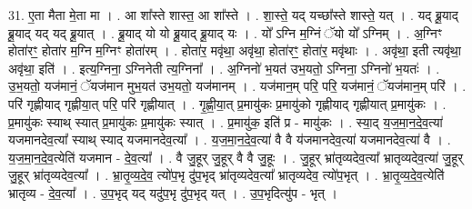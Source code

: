 \documentclass[17pt]{extarticle}
\begin{document}
31. ए॒ता मैता मे॒ता मा । . आ शा᳚स्ते शास्त॒ आ शा᳚स्ते । . शा॒स्ते॒ यद् यच्छा᳚स्ते शास्ते॒ यत् । . यद् ब्रू॒याद् ब्रू॒याद् यद् यद् ब्रू॒यात् । . ब्रू॒याद् यो यो ब्रू॒याद् ब्रू॒याद् यः । . यो᳚ ऽग्नि म॒ग्निं ॅयो यो᳚ ऽग्निम् । . अ॒ग्निꣳ होता॑रꣳ॒॒ होता॑र म॒ग्नि म॒ग्निꣳ होता॑रम् । . होता॑र॒ मवृ॑था॒ अवृ॑था॒ होता॑रꣳ॒॒ होता॑र॒ मवृ॑थाः । . अवृ॑था॒ इती त्यवृ॑था॒ अवृ॑था॒ इति॑ । . इत्य॒ग्निना॒ ऽग्निनेती त्य॒ग्निना᳚ । . अ॒ग्निनो॑ भ॒यत॑ उभ॒यतो॒ ऽग्निना॒ ऽग्निनो॑ भ॒यतः॑ । . उ॒भ॒यतो॒ यज॑मानं॒ ॅयज॑मान मुभ॒यत॑ उभ॒यतो॒ यज॑मानम् । . यज॑मान॒म् परि॒ परि॒ यज॑मानं॒ ॅयज॑मान॒म् परि॑ । . परि॑ गृह्णीयाद् गृह्णीया॒त् परि॒ परि॑ गृह्णीयात् । . गृ॒ह्णी॒या॒त् प्र॒मायु॑कः प्र॒मायु॑को गृह्णीयाद् गृह्णीयात् प्र॒मायु॑कः । . प्र॒मायु॑कः स्याथ् स्यात् प्र॒मायु॑कः प्र॒मायु॑कः स्यात् । . प्र॒मायु॑क॒ इति॑ प्र - मायु॑कः । . स्या॒द् य॒ज॒मा॒न॒दे॒व॒त्या॑ यजमानदेव॒त्या᳚ स्याथ् स्याद् यजमानदेव॒त्या᳚ । . य॒ज॒मा॒न॒दे॒व॒त्या॑ वै वै य॑जमानदेव॒त्या॑ यजमानदेव॒त्या॑ वै । . य॒ज॒मा॒न॒दे॒व॒त्येति॑ यजमान - दे॒व॒त्या᳚ । . वै जु॒हूर् जु॒हूर् वै वै जु॒हूः । . जु॒हूर् भ्रा॑तृव्यदेव॒त्या᳚ भ्रातृव्यदेव॒त्या॑ जु॒हूर् जु॒हूर् भ्रा॑तृव्यदेव॒त्या᳚ । . भ्रा॒तृ॒व्य॒दे॒व॒ त्यो॑प॒भृ दु॑प॒भृद् भ्रा॑तृव्यदेव॒त्या᳚ भ्रातृव्यदेव॒ त्यो॑प॒भृत् । . भ्रा॒तृ॒व्य॒दे॒व॒त्येति॑ भ्रातृव्य - दे॒व॒त्या᳚ । . उ॒प॒भृद् यद् यदु॑प॒भृ दु॑प॒भृद् यत् । . उ॒प॒भृदित्यु॑प - भृत् । \newline
\end{document}
